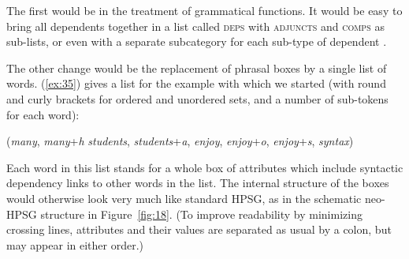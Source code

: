 \documentclass[output=paper,biblatex,babelshorthands,newtxmath,draftmode,colorlinks,citecolor=brown]{langscibook}
\begin{document}
The first would be in the treatment of grammatical functions. It would be easy to bring all
dependents together in a list called \textsc{deps} \citep{BMS2001a} with \textsc{adjuncts} and
\textsc{comps} as sub-lists, or even with a separate subcategory for each sub-type of dependent
\citep{Hellan2017}.

The other change would be the replacement of phrasal boxes by a single list of words. (\ref{ex:35})
gives a list for the example with which we started (with round and curly brackets for ordered and
unordered sets, and a number of sub-tokens for each word):

\begin{exe}
	\ex \label{ex:35} ({\emph{many}, \emph{many}+\emph{h}} {\emph{students}, \emph{students}+\emph{a}}, {\emph{enjoy}, \emph{enjoy}+\emph{o}, \emph{enjoy}+\emph{s}}, \emph{syntax})
\end{exe}

\noindent
Each word in this list stands for a whole box of attributes which include syntactic dependency links
to other words in the list. The internal structure of the boxes would otherwise look very much like
standard HPSG, as in the schematic neo-HPSG structure in Figure~\ref{fig:18}. (To improve
readability by minimizing crossing lines, attributes and their values are separated as usual by a
colon, but may appear in either order.)
\end{document}
